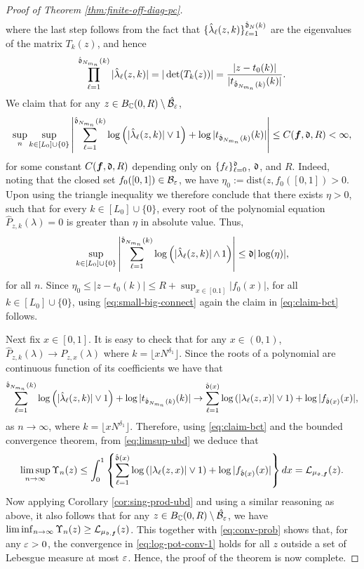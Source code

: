 \documentclass{amsart}
\numberwithin{equation}{section}
\def\corAB{}
\def\corOZ{}
\begin{document}
\begin{proof}[Proof of Theorem \ref{thm:finite-off-diag-pc}]
\begin{align}
\end{align}
where the last step follows from the fact that $\{\hat{\lambda}_{\ell}(z,k)\}_{\ell=1}^{\hat{\mathfrak{d}}_N(k)}$ are the eigenvalues of the matrix $T_k(z)$, and hence
\begin{equation}\label{eq:small-big-connect}
\prod_{\ell=1}^{\hat{\mathfrak{d}}_{N_{m_n}}(k)} |\hat{\lambda}_\ell(z,k)| = |\det (T_k(z))| = \frac{|z-t_0(k)|}{|t_{\hat{\mathfrak{d}}_{N_{m_n}}(k)}(k)|}.
\end{equation}
We claim that for any $z \in B_\C(0,R)\setminus \corOZ{\hat \cN_\vep}$,
\begin{equation}\label{eq:claim-bct}
\sup_n \sup_{k\in[L_0]\cup \{0\}}  \left|  \sum_{\ell=1}^{\hat{\mathfrak{d}}_{N_{m_n}}(k)} \log \left(|\hat{\lambda}_\ell(z,k)| \vee 1\right) + \log |t_{\hat{\mathfrak{d}}_{N_{m_n}}(k)}(k)|\right| \le C({\bm f}, \mathfrak{d}, R) <\infty,
\end{equation}
for some constant $C({\bm f}, \mathfrak{d}, R)$ depending only on $\{f_{\ell}\}_{\ell=0}^{\mathfrak{d}}$, $\mathfrak{d}$, and $R$. Indeed, noting that the closed set $f_0([0,1]) \in \mathcal{B}_\varepsilon$, we have $\eta_0:=\mathrm{dist}(z, f_0([0,1]) >0$. Upon using the triangle inequality we therefore conclude that there exists $\eta >0$, such that for every $k \in [L_0]\cup\{0\}$, every root of the polynomial equation $\hat{P}_{z,k}(\lambda)=0$ is greater than $\eta$ in absolute value. Thus,
\[
\sup_{k \in [L_0]\cup\{0\}} \left| \sum_{\ell=1}^{\hat\gd_{N_{m_n}}(k)} \log \left(|\hat{\lambda}_\ell(z,k)|\,  \corAB{\wedge} \,1\right)\right| \le \gd |\log (\eta)|,
\]
for all $n$. Since $ \eta_0 \le |z -t_0(k)| \le R + \sup_{x \in [0.1]} |f_0(x)|$, for all $k \in [L_0]\cup\{0\}$, using \eqref{eq:small-big-connect} again the claim in \eqref{eq:claim-bct} follows.

Next fix $x \in [0,1]$. It is easy to check that for any $x \in (0,1)$, $\hat{P}_{z,k}(\lambda) \to P_{z,x}(\lambda)$ where $k = \lfloor x N^{\delta_1} \rfloor$. Since the roots of a polynomial are continuous function of its coefficients we have that
\[
\sum_{\ell=1}^{\hat{\mathfrak{d}}_{N_{m_n}}(k)} \log \left(|\hat{\lambda}_\ell(z,k)| \vee 1\right) + \log |t_{\hat{\mathfrak{d}}_{N_{m_n}}(k)}(k)| \to \sum_{\ell=1}^{\hat{\mathfrak{d}}(x)} \log \left(|{\lambda}_\ell(z,x)| \vee 1\right) + \log |f_{\hat{\mathfrak{d}}(x)}(x)|,
\]
as $n \to \infty$, where $k = \lfloor x N^{\delta_1} \rfloor$. Therefore, using \eqref{eq:claim-bct} and the bounded convergence theorem, from \eqref{eq:limsup-ubd} we deduce that
\[
\limsup_{n \to \infty} \Upsilon_n(z) \le \int_0^1 \left\{\sum_{\ell=1}^{\hat{\mathfrak{d}}(x)} \log \left(|{\lambda}_\ell(z,x)| \vee 1\right) + \log |f_{\hat{\mathfrak{d}}(x)}(x)|\right\} dx = \mathcal{L}_{\mu_{\mathfrak{d}, {\bm f}}}(z).
\]
Now applying Corollary \ref{cor:sing-prod-ubd} and using a similar reasoning as above, it also follows that for any $z \in B_\C(0,R)\setminus
\corOZ{\hat \cN_\vep}$, we have $\liminf_{n \to \infty} \Upsilon_n(z) \ge  \mathcal{L}_{\mu_{\mathfrak{d}, {\bm f}}}(z)$. This together with \eqref{eq:conv-prob} shows that, for any $\varepsilon>0$, the convergence in \eqref{eq:log-pot-conv-1} holds for all $z$ outside a set of Lebesgue measure at most $\varepsilon$. Hence, the proof of the theorem is now complete.
\end{proof}
\end{document}
